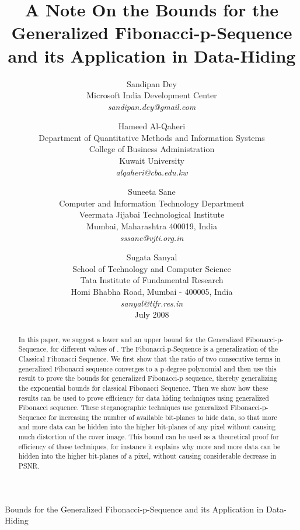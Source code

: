 \documentclass{ijcsa}
\begin{document}
\catchline{}{}{}{}{}

{Bounds for the Generalized Fibonacci-p-Sequence and its Application in Data-Hiding}

\title{A Note On the Bounds for the Generalized Fibonacci-p-Sequence and its Application in Data-Hiding}

\author{Sandipan Dey
\\Microsoft India Development Center
\\\emph{sandipan.dey@gmail.com}
}
\author{Hameed Al-Qaheri
\\Department of Quantitative Methods and Information Systems
\\College of Business Administration
\\Kuwait University
\\\emph{alqaheri@cba.edu.kw}
}
\author{Suneeta Sane
\\Computer and Information Technology Department
\\Veermata Jijabai Technological Institute
\\Mumbai, Maharashtra 400019, India
\\\emph{sssane@vjti.org.in}
}
\author{Sugata Sanyal
\\School of Technology and Computer Science
\\Tata Institute of Fundamental Research
\\Homi Bhabha Road, Mumbai - 400005, India
\\\emph{sanyal@tifr.res.in}
\\July 2008
}

\date{}

\maketitle

\begin{abstract}
\par In this paper, we suggest a lower and an upper bound for the Generalized Fibonacci-p-Sequence, 
for different values of . The Fibonacci-p-Sequence is a generalization of
the Classical Fibonacci Sequence. We first show that the ratio of two consecutive terms in generalized 
Fibonacci sequence converges to a p-degree polynomial and then use this result to prove the  
bounds for generalized Fibonacci-p sequence, thereby generalizing the exponential bounds for 
classical Fibonacci Sequence. Then we show how these results can be used to prove efficiency for 
data hiding techniques using generalized Fibonacci sequence. These steganographic techniques 
use generalized Fibonacci-p-Sequence for increasing the number of available bit-planes to hide data, 
so that more and more data can be hidden into the higher bit-planes of any pixel without causing much 
distortion of the cover image. This bound can be used as a theoretical 
proof for efficiency of those techniques, for instance it explains why more and more data can be 
hidden into the higher bit-planes of a pixel, without causing considerable decrease in PSNR. 

\end{abstract}
\end{document}
